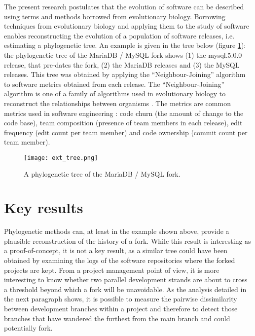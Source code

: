 The present research postulates that the evolution of software can be described using terms and methods borrowed from evolutionary biology. Borrowing techniques from evolutionary biology and applying them to the study of software enables reconstructing the evolution of a population of software releases, i.e. estimating a phylogenetic tree. An example is given in the tree below (figure \ref{fig:ext_tree}): the phylogenetic tree of the MariaDB / MySQL fork shows (1) the mysql.5.0.0 release, that pre-dates the fork, (2) the MariaDB releases and (3) the MySQL releases. This tree was obtained by applying the “Neighbour-Joining” algorithm to software metrics obtained from each release. The “Neighbour-Joining” algorithm is one of a family of algorithms used in evolutionary biology to reconstruct the relationships between organisms \citep{Saitou1987a}. The metrics are common metrics used in software engineering \citep{Nagappan2008a}: code churn (the amount of change to the code base), team composition (presence of team members in each release), edit frequency (edit count per team member) and code ownership (commit count per team member).

\begin{figure}[H]
  \texttt{[image: ext\_tree.png]}
  \caption{A phylogenetic tree of the MariaDB / MySQL fork.}
  \label{fig:ext_tree}
\end{figure}


\section*{Key results}
Phylogenetic methods can, at least in the example shown above, provide a plausible reconstruction of the history of a fork. While this result is interesting as a proof-of-concept, it is not a key result, as a similar tree could have been obtained by examining the logs of the software repositories where the forked projects are kept. From a project management point of view, it is more interesting to know whether two parallel development strands are about to cross a threshold beyond which a fork will be unavoidable. As the analysis detailed in the next paragraph shows, it is possible to measure the pairwise dissimilarity between development branches within a project and therefore to detect those branches that have wandered the furthest from the main branch and could potentially fork.

